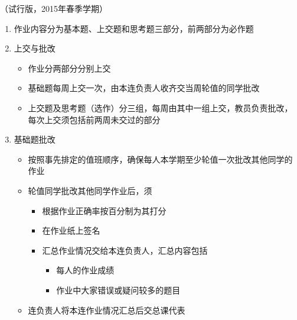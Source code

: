 	\begin{center}
		（试行版，2015年春季学期）
	\end{center}
	
	\begin{enumerate}
	  \item 作业内容分为基本题、上交题和思考题三部分，前两部分为必作题
	  \item 上交与批改
	  \begin{itemize}
	    \item 作业分两部分分别上交
	    \item 基础题每周上交一次，由本连负责人收齐交当周轮值的同学批改
	    \item 上交题及思考题（选作）分三组，每周由其中一组上交，教员负责批改，
	    每次上交须包括前两周未交过的部分
	  \end{itemize}
	  \item 基础题批改
	  \begin{itemize}
	    \item 按照事先排定的值班顺序，确保每人本学期至少轮值一次批改其他同学的作业
	    \item 轮值同学批改其他同学作业后，须
	    \begin{itemize}
	      \item 根据作业正确率按百分制为其打分
	      \item 在作业纸上签名
	      \item 汇总作业情况交给本连负责人，汇总内容包括
	      \begin{itemize}
	        \item 每人的作业成绩
	        \item 作业中大家错误或疑问较多的题目
	      \end{itemize}
	    \end{itemize}
	    \item 连负责人将本连作业情况汇总后交总课代表
	  \end{itemize}
	\end{enumerate}
	
	\newpage

\fi